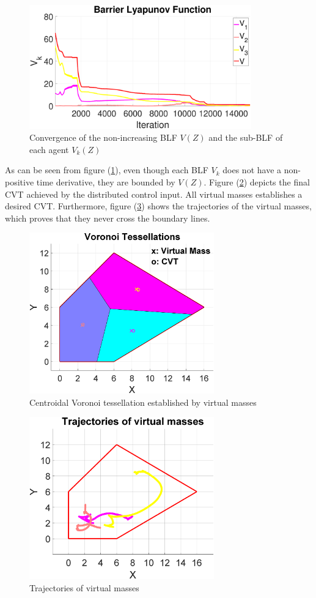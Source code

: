 \documentclass[journal]{IEEEtran}
\begin{document}
	\begin{figure}[H]
		\centering
		\includegraphics[width=9.6cm]{BLF}
		\caption{Convergence of the non-increasing BLF $V(Z)$ and the sub-BLF of each agent $V_k(Z)$}
		\label{fig:BLF}
	\end{figure}
	
	As can be seen from figure (\ref{fig:BLF}), even though each BLF $V_k$ does not have a non-positive time derivative, they are bounded by $V(Z)$. Figure (\ref{fig:CVT}) depicts the final CVT achieved by the distributed control input. All virtual masses establishes a desired CVT. Furthermore, figure (\ref{fig:vmTraj}) shows the trajectories of the virtual
	masses, which proves that they never cross the boundary lines.
	
	\begin{figure}[H]
		\centering
		\includegraphics[width=8cm]{Voronoi_Tessellation.eps}
		\caption{Centroidal Voronoi tessellation established by virtual masses}
		\label{fig:CVT}
	\end{figure}
	
	\begin{figure}[H]
		\centering
		\includegraphics[width=8cm]{VM_Trajectories.eps}
		\caption{Trajectories of virtual masses}
		\label{fig:vmTraj}
	\end{figure}
	
\end{document}
